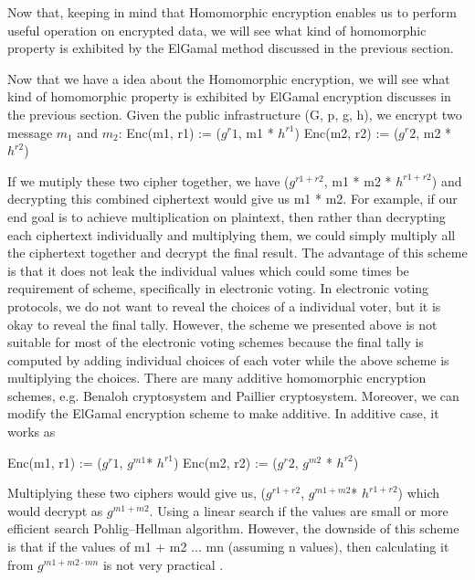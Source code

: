 	    
	    
	    
	     
	    Now that, keeping in mind that Homomorphic encryption enables us to perform useful operation on encrypted data, 
	    we will see what kind of homomorphic property is exhibited by the ElGamal method discussed in the previous section. 
	    
	     
	     Now that we have a idea about the Homomorphic encryption, we will see what kind of homomorphic property is 
	     exhibited by ElGamal encryption discusses in the previous section.  Given the public infrastructure (G, p, g, h), 
	     we encrypt two message $m_{1}$ and $m_{2}$:
	     Enc(m1, r1) := ($g^r1$, m1 * $ h^{r1}$) 
	     Enc(m2, r2) := ($g^r2$, m2 * $ h^{r2}$) 
	     
	     If we mutiply these two cipher together, we have  ($g^{r1+ r2}$, m1 * m2 * $ h^{r1 + r2}$) and decrypting this combined ciphertext 
	     would give us m1 * m2. For example, if our end goal is  to achieve multiplication on plaintext, then rather than decrypting each ciphertext individually 
	     and multiplying them, we could simply multiply all the ciphertext together and decrypt the final result. The advantage of this scheme 
	     is that it does not leak the individual values which could some times be requirement of scheme, specifically in electronic voting. 
	     In electronic voting protocols, we do not want to reveal the choices of a individual voter, but it is okay to reveal the final tally.
	     However, the scheme we presented above is not suitable for most of the electronic voting schemes because the final tally 
	     is computed by adding individual choices of each voter while the above scheme is multiplying the choices.  There are 
	     many additive homomorphic encryption schemes, e.g. Benaloh cryptosystem and Paillier cryptosystem. Moreover, we 
	     can modify the ElGamal encryption scheme to make additive. In additive case, it works as 
	     
	      Enc(m1, r1) := ($g^r1$, $g^{m1} $* $ h^{r1}$) 
	      Enc(m2, r2) := ($g^r2$, $g^{m2}$ * $ h^{r2}$) 
	      
	      Multiplying these two ciphers would give us,  ($g^{r1 + r2}$, $g^{m1 + m2} $* $ h^{r1 + r2}$) which would decrypt as 
	      $g^{m1 + m2}$. Using a linear search if the values are small or more efficient search Pohlig–Hellman algorithm. However, the downside 
	      of this scheme is that if the values of m1 + m2 ... mn (assuming n values), then calculating it from $g^{m1 + m2 \cdot mn}$ is 
	      not very practical \citep{10.1007/3-540-69053-0_9}. 
	     
